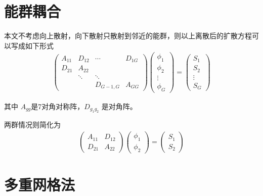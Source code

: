 \section{能群耦合\TODO}

本文不考虑向上散射，向下散射只散射到邻近的能群，则以上离散后的扩散方程可以写成如下形式
\begin{align}
  \begin{pmatrix}
  A_{11} & D_{12} & \cdots & D_{1G}\\
  D_{21} & A_{22} & &\\
   & \ddots & \ddots &\\
   & & D_{G-1,G} & A_{GG}
  \end{pmatrix}
  \begin{pmatrix}
  \phi_1 \\ \phi_2 \\ \vdots \\ \phi_G
  \end{pmatrix}
  =
  \begin{pmatrix}
  S_1 \\ S_2 \\ \vdots \\ S_G
  \end{pmatrix}
\end{align}

其中 $A_{gg}$是7对角对称阵，$D_{g_1g_2}$ 是对角阵。

两群情况则简化为
\begin{align}
  \begin{pmatrix}
  A_{11} & D_{12} \\
  D_{21} & A_{22}
  \end{pmatrix}
  \begin{pmatrix}
  \phi_1 \\ \phi_2
  \end{pmatrix}
  =
  \begin{pmatrix}
  S_1 \\ S_2
  \end{pmatrix}
\end{align}

\TODO

\section{多重网格法\TODO}

